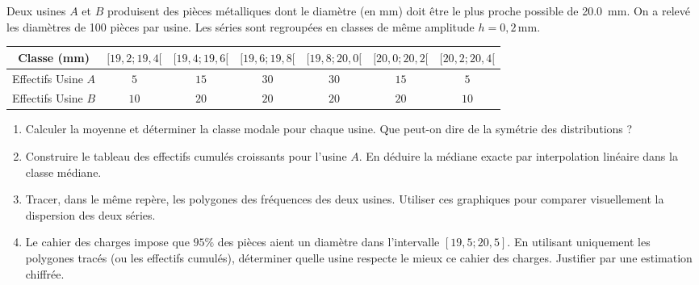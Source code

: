 \documentclass[11pt]{article}
\begin{document}
\begin{exercice}
Deux usines $A$ et $B$ produisent des pièces métalliques dont le diamètre (en mm) doit être le plus proche possible de \SI{20,0}{mm}. On a relevé les diamètres de \num{100} pièces par usine. Les séries sont regroupées en classes de même amplitude $h = 0,2\,\text{mm}$.

\begin{center}
\begin{tabular}{|c|c|c|c|c|c|c|}
\hline
Classe (mm) & $[19,2 ; 19,4[$ & $[19,4 ; 19,6[$ & $[19,6 ; 19,8[$ & $[19,8 ; 20,0[$ & $[20,0 ; 20,2[$ & $[20,2 ; 20,4[$ \\
\hline
Effectifs Usine $A$ & $5$ & $15$ & $30$ & $30$ & $15$ & $5$ \\
\hline
Effectifs Usine $B$ & $10$ & $20$ & $20$ & $20$ & $20$ & $10$ \\
\hline
\end{tabular}
\end{center}

\begin{enumerate}
    \item Calculer la moyenne et déterminer la classe modale pour chaque usine. Que peut-on dire de la symétrie des distributions ?
    \item Construire le tableau des effectifs cumulés croissants pour l'usine $A$. En déduire la médiane exacte par interpolation linéaire dans la classe médiane.
    \item Tracer, dans le même repère, les polygones des fréquences des deux usines. Utiliser ces graphiques pour comparer visuellement la dispersion des deux séries.
    \item Le cahier des charges impose que $95\%$ des pièces aient un diamètre dans l'intervalle $[19,5 ; 20,5]$. En utilisant uniquement les polygones tracés (ou les effectifs cumulés), déterminer quelle usine respecte le mieux ce cahier des charges. Justifier par une estimation chiffrée.
\end{enumerate}
\end{exercice}
\end{document}
